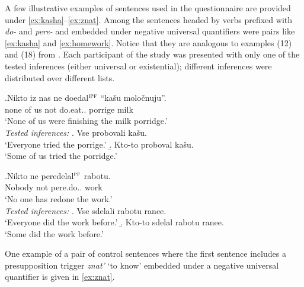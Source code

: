 A few illustrative examples of sentences used in the questionnaire are provided under \ref{ex:kasha}--\ref{ex:znat}. Among the sentences headed by verbs prefixed with \textit{do-} and \textit{pere-} and embedded under negative universal quantifiers were pairs like \ref{ex:kasha} and \ref{ex:homework}. Notice that they are analogous to examples (12) and (18) from \citealt{Chemla:09}. Each participant  of the study was presented with only one of the tested inferences (either universal or existential); different inferences were distributed over different lists.

\exg.\label{ex:kasha}Nikto iz nas ne doedal$^{\textsc{ipf}}$ ``ka\v{s}u molo\v{c}nuju''.\\
none of us not do.eat.. porrige milk\\
\trans `None of us were finishing the milk porridge.'\smallskip\\
\textit{Tested inferences:}
\a. Vse probovali ka\v{s}u.\\
`Everyone tried the porrige.'
\b. Kto-to proboval ka\v{s}u.\\
`Some of us tried the porridge.'


\exg.\label{ex:homework}Nikto ne peredelal$^{\textsc{pf}}$ rabotu.\\
Nobody not pere.do.. work\\
\trans `No one has redone the work.'\smallskip\\
\textit{Tested inferences:}
\a. \label{test:homework1}Vse sdelali rabotu ranee.\\
`Everyone did the work before.'
\b. \label{test:homework2}Kto-to sdelal rabotu ranee.\\
`Some did the work before.'


One example of a pair of control sentences where the first sentence includes a presupposition trigger \textit{znat'} `to know' embedded under a negative universal quantifier is given in \ref{ex:znat}.

